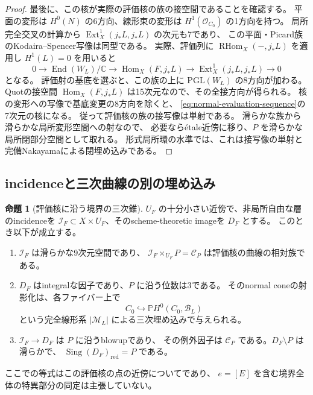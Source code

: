 \documentclass[a4paper,11pt]{ltjsarticle}
\newcommand{\mathscr}{\mathcal}
\theoremstyle{definition}
\newtheorem{theorem}{命題}[section]
\newcommand{\CC}{\mathbb C}
\newcommand{\OO}{\mathcal O}
\newcommand{\PP}{\mathbb P}
\newcommand{\Ext}{\operatorname{Ext}}
\newcommand{\Hom}{\operatorname{Hom}}
\newcommand{\RHom}{\operatorname{RHom}}
\begin{document}
\begin{proof}
最後に、この核が実際の評価核の族の接空間であることを確認する。
平面の変形は $H^0(N)$ の6方向、線形束の変形は $H^1(\OO_{C_0})$ の1方向を持つ。
局所完全交叉の計算から $\Ext^1_X(j_*L,j_*L)$ の次元も7であり、
この平面・Picard族のKodaira--Spencer写像は同型である。
実際、評価列に $\RHom_X(-,j_*L)$ を適用し $H^1(L)=0$ を用いると
\[
 0\longrightarrow\operatorname{End}(W_L)/\CC
 \longrightarrow\Hom_X(F,j_*L)
 \longrightarrow\Ext^1_X(j_*L,j_*L)\longrightarrow0
\]
となる。
評価射の基底を選ぶと、この族の上に $\mathrm{PGL}(W_L)$ の8方向が加わる。
Quotの接空間 $\Hom_X(F,j_*L)$ は15次元なので、その全接方向が得られる。
核の変形への写像で基底変更の8方向を除くと、
\eqref{eq:normal-evaluation-sequence}の7次元の核になる。
従って評価核の族の接写像は単射である。
滑らかな族から滑らかな局所変形空間への射なので、
必要ならétale近傍に移り、$P$ を滑らかな局所閉部分空間として取れる。
形式局所環の水準では、これは接写像の単射と完備Nakayamaによる閉埋め込みである。
\end{proof}

\subsection{incidenceと三次曲線の別の埋め込み}

\begin{theorem}[評価核に沿う境界の三次錐]\label{thm:local-bn-cubic}
$U_F$ の十分小さい近傍で、非局所自由な層のincidenceを
$\mathcal I_F\subset X\times U_F$、そのscheme-theoretic imageを $D_F$ とする。
このとき以下が成立する。
\begin{enumerate}
 \item $\mathcal I_F$ は滑らかな9次元空間であり、
 $\mathcal I_F\times_{U_F}P=\mathscr C_P$ は評価核の曲線の相対族である。
 \item $D_F$ はintegralな因子であり、$P$ に沿う位数は3である。
 そのnormal coneの射影化は、各ファイバー上で
 \[
 C_0\hookrightarrow\PP H^0(C_0,\mathcal B_L)
 \]
 という完全線形系 $|\mathcal M_L|$ による三次埋め込みで与えられる。
 \item $\mathcal I_F\to D_F$ は $P$ に沿うblowupであり、
 その例外因子は $\mathscr C_P$ である。$D_F\setminus P$ は滑らかで、
 $\operatorname{Sing}(D_F)_{\mathrm{red}}=P$ である。
\end{enumerate}
ここでの等式はこの評価核の点の近傍についてであり、
$e=[E]$ を含む境界全体の特異部分の同定は主張していない。
\end{theorem}
\end{document}
